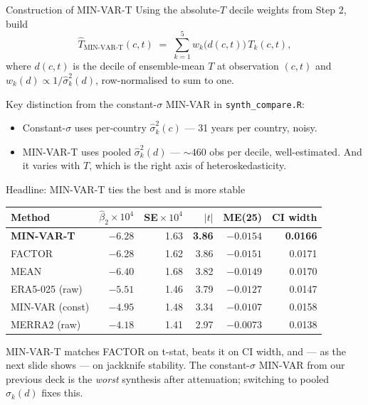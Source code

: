 \documentclass[10pt,aspectratio=169]{beamer}
\begin{document}
\begin{frame}{Construction of MIN-VAR-T}
  Using the absolute-$T$ decile weights from Step 2, build
  \[
    \hat T_{\text{MIN-VAR-T}}(c, t) \;=\; \sum_{k=1}^{5} w_k\bigl(d(c,t)\bigr) \, T_k(c, t),
  \]
  where $d(c,t)$ is the decile of ensemble-mean $T$ at observation $(c,t)$
  and $w_k(d) \propto 1/\hat\sigma_k^2(d)$, row-normalised to sum to one.
  \vspace{0.3em}

  Key distinction from the constant-$\sigma$ MIN-VAR in
  \texttt{synth\_compare.R}:
  \begin{itemize}
    \item Constant-$\sigma$ uses per-country $\hat\sigma_k^2(c)$ --- 31
          years per country, noisy.
    \item MIN-VAR-T uses pooled $\hat\sigma_k^2(d)$ --- $\sim\!460$ obs per
          decile, well-estimated. And it varies with $T$, which is the
          right axis of heteroskedasticity.
  \end{itemize}
\end{frame}

\begin{frame}{Headline: MIN-VAR-T ties the best and is more stable}
  \centering
  \small
  \begin{tabular}{l r r r r r}
    \toprule
    Method    & $\hat\beta_2\!\times\!10^4$ & SE$\!\times\!10^4$ & $|t|$ & ME(25) & CI width \\
    \midrule
    \textbf{MIN-VAR-T} & $-6.28$ & 1.63 & \textbf{3.86} & $-0.0154$ & \textbf{0.0166} \\
    FACTOR             & $-6.28$ & 1.62 & 3.86          & $-0.0151$ & 0.0171 \\
    MEAN               & $-6.40$ & 1.68 & 3.82          & $-0.0149$ & 0.0170 \\
    ERA5-025 (raw)     & $-5.51$ & 1.46 & 3.79          & $-0.0127$ & 0.0147 \\
    MIN-VAR (const)    & $-4.95$ & 1.48 & 3.34          & $-0.0107$ & 0.0158 \\
    MERRA2 (raw)       & $-4.18$ & 1.41 & 2.97          & $-0.0073$ & 0.0138 \\
    \bottomrule
  \end{tabular}

  \vspace{0.6em}
  \footnotesize
  MIN-VAR-T matches FACTOR on t-stat, beats it on CI width, and --- as the
  next slide shows --- on jackknife stability. The constant-$\sigma$
  MIN-VAR from our previous deck is the \emph{worst} synthesis after
  attenuation; switching to pooled $\sigma_k(d)$ fixes this.
\end{frame}
\end{document}
